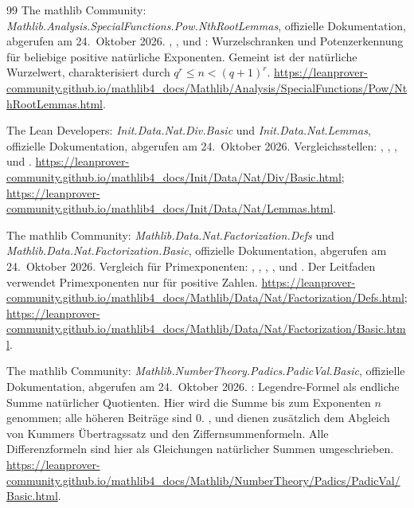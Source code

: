 \begin{thebibliography}{99}
The mathlib Community:
\emph{Mathlib.Analysis.SpecialFunctions.Pow.NthRootLemmas},
offizielle Dokumentation, abgerufen am 24.~Oktober 2026.
, ,
 und :
Wurzelschranken und Potenzerkennung für beliebige positive
natürliche Exponenten. Gemeint ist der natürliche Wurzelwert,
charakterisiert durch $q^r\le n<(q+1)^r$.
\url{https://leanprover-community.github.io/mathlib4_docs/Mathlib/Analysis/SpecialFunctions/Pow/NthRootLemmas.html}.

The Lean Developers: \emph{Init.Data.Nat.Div.Basic} und
\emph{Init.Data.Nat.Lemmas}, offizielle Dokumentation,
abgerufen am 24.~Oktober 2026.
Vergleichsstellen: ,
, ,
 und .
\url{https://leanprover-community.github.io/mathlib4_docs/Init/Data/Nat/Div/Basic.html};
\url{https://leanprover-community.github.io/mathlib4_docs/Init/Data/Nat/Lemmas.html}.

The mathlib Community: \emph{Mathlib.Data.Nat.Factorization.Defs}
und \emph{Mathlib.Data.Nat.Factorization.Basic}, offizielle
Dokumentation, abgerufen am 24.~Oktober 2026.
Vergleich für Primexponenten:
, ,
, ,
 und .
Der Leitfaden verwendet Primexponenten nur für positive Zahlen.
\url{https://leanprover-community.github.io/mathlib4_docs/Mathlib/Data/Nat/Factorization/Defs.html};
\url{https://leanprover-community.github.io/mathlib4_docs/Mathlib/Data/Nat/Factorization/Basic.html}.

The mathlib Community: \emph{Mathlib.NumberTheory.Padics.PadicVal.Basic},
offizielle Dokumentation, abgerufen am 24.~Oktober 2026.
: Legendre-Formel als endliche Summe
natürlicher Quotienten. Hier wird die Summe bis zum Exponenten $n$
genommen; alle höheren Beiträge sind $0$.
,
 und
 dienen zusätzlich dem
Abgleich von Kummers Übertragssatz und den Ziffernsummenformeln.
Alle Differenzformeln sind hier als Gleichungen natürlicher
Summen umgeschrieben.
\url{https://leanprover-community.github.io/mathlib4_docs/Mathlib/NumberTheory/Padics/PadicVal/Basic.html}.


\end{thebibliography}
